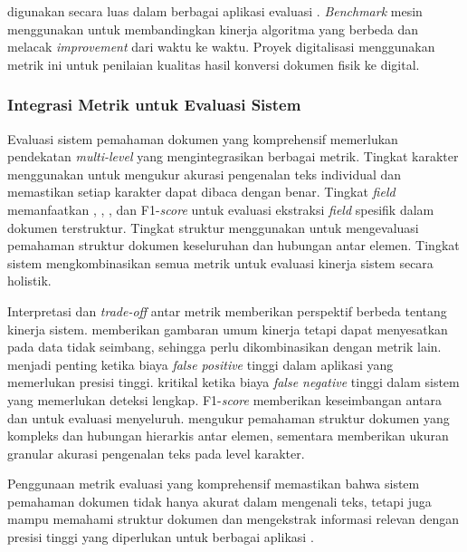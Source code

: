 \mcer digunakan secara luas dalam berbagai aplikasi evaluasi \ocr. \emph{Benchmark} mesin \ocr menggunakan \mcer untuk membandingkan kinerja algoritma yang berbeda dan melacak \emph{improvement} dari waktu ke waktu. Proyek digitalisasi menggunakan metrik ini untuk penilaian kualitas hasil konversi dokumen fisik ke digital.

\subsubsection{Integrasi Metrik untuk Evaluasi Sistem}

Evaluasi sistem pemahaman dokumen yang komprehensif memerlukan pendekatan \emph{multi-level} yang mengintegrasikan berbagai metrik. Tingkat karakter menggunakan \mcer untuk mengukur akurasi pengenalan teks individual dan memastikan setiap karakter dapat dibaca dengan benar. Tingkat \emph{field} memanfaatkan \accuracy, \precision, \recall, dan F1-\emph{score} untuk evaluasi ekstraksi \emph{field} spesifik dalam dokumen terstruktur. Tingkat struktur menggunakan \ted untuk mengevaluasi pemahaman struktur dokumen keseluruhan dan hubungan antar elemen. Tingkat sistem mengkombinasikan semua metrik untuk evaluasi kinerja sistem secara holistik.

Interpretasi dan \emph{trade-off} antar metrik memberikan perspektif berbeda tentang kinerja sistem. \accuracy memberikan gambaran umum kinerja tetapi dapat menyesatkan pada data tidak seimbang, sehingga perlu dikombinasikan dengan metrik lain. \precision menjadi penting ketika biaya \emph{false positive} tinggi dalam aplikasi yang memerlukan presisi tinggi. \recall kritikal ketika biaya \emph{false negative} tinggi dalam sistem yang memerlukan deteksi lengkap. F1-\emph{score} memberikan keseimbangan antara \precision dan \recall untuk evaluasi menyeluruh. \ted mengukur pemahaman struktur dokumen yang kompleks dan hubungan hierarkis antar elemen, sementara \mcer memberikan ukuran granular akurasi pengenalan teks pada level karakter.

Penggunaan metrik evaluasi yang komprehensif memastikan bahwa sistem pemahaman dokumen tidak hanya akurat dalam mengenali teks, tetapi juga mampu memahami struktur dokumen dan mengekstrak informasi relevan dengan presisi tinggi yang diperlukan untuk berbagai aplikasi \parencite{bille2005tree}.

